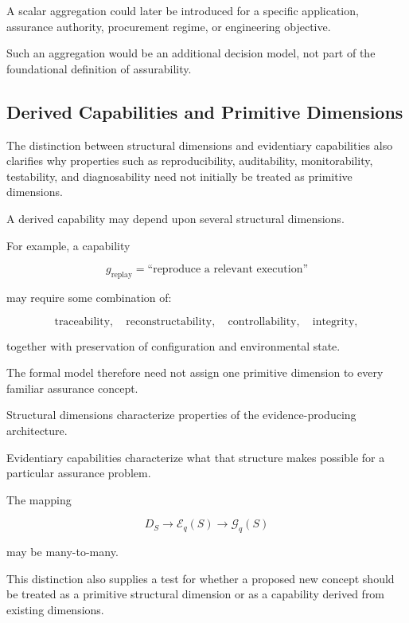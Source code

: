 A scalar aggregation could later be introduced for a specific application, assurance authority, procurement regime, or engineering objective.

Such an aggregation would be an additional decision model, not part of the foundational definition of assurability.

\subsection{Derived Capabilities and Primitive Dimensions}
\label{aa.subsec.derived-formal}

The distinction between structural dimensions and evidentiary capabilities
also clarifies why properties such as reproducibility, auditability, monitorability, testability, and diagnosability
need not initially be treated as primitive dimensions.

A derived capability may depend upon several structural dimensions.

For example, a capability

\begin{equation}
  g_{\mathrm{replay}}
  =
  \text{``reproduce a relevant execution''}
\end{equation}

may require some combination of:

\begin{equation}
  \text{traceability},
  \quad
  \text{reconstructability},
  \quad
  \text{controllability},
  \quad
  \text{integrity},
\end{equation}

together with preservation of configuration and environmental state.

The formal model therefore need not assign one primitive dimension to every familiar assurance concept.

Structural dimensions characterize properties of the evidence-producing architecture.

Evidentiary capabilities characterize what that structure makes possible for a particular assurance problem.

The mapping

\begin{equation}
  D_S
  \longrightarrow
  \mathcal{E}_q(S)
  \longrightarrow
  \mathcal{G}_q(S)
  \label{eq:dimensions-to-capabilities}
\end{equation}

may be many-to-many.

This distinction also supplies a test for whether a proposed new concept
should be treated as a primitive structural dimension or as a capability derived from existing dimensions.

